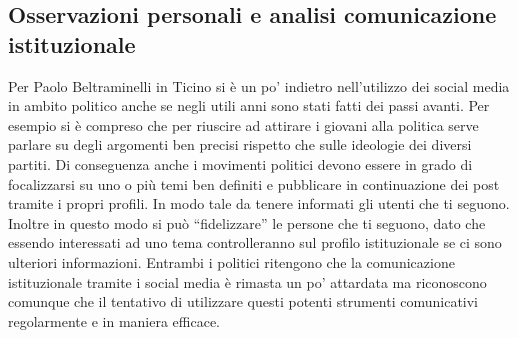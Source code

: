 \subsection{Osservazioni personali e analisi comunicazione istituzionale}
Per Paolo Beltraminelli in Ticino si è un po’ indietro nell’utilizzo dei social media in ambito politico anche se negli utili anni sono stati fatti dei passi avanti. Per esempio si è compreso che per riuscire ad attirare i giovani alla politica serve parlare su degli argomenti ben precisi rispetto che sulle ideologie dei diversi partiti. Di conseguenza anche i movimenti politici devono essere in grado di focalizzarsi su uno o più temi ben definiti e pubblicare in continuazione dei post tramite i propri profili. In modo tale da tenere informati gli utenti che ti seguono. Inoltre in questo modo si può “fidelizzare” le persone che ti seguono, dato che essendo interessati ad uno tema controlleranno sul profilo istituzionale se ci sono ulteriori informazioni.
Entrambi i politici ritengono che la comunicazione istituzionale tramite i social media è rimasta un po' attardata ma riconoscono comunque che il tentativo di utilizzare questi potenti strumenti comunicativi regolarmente e in maniera efficace. 
